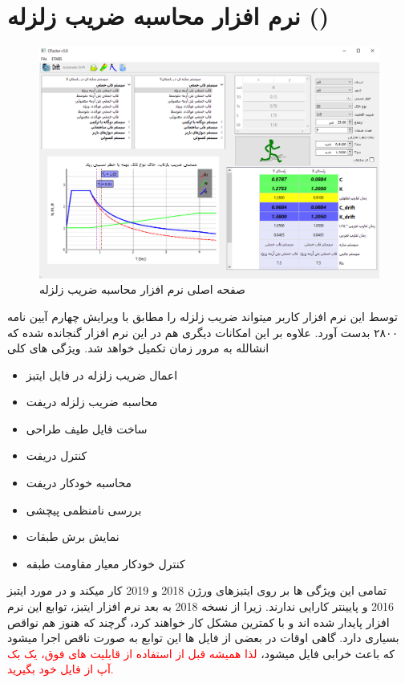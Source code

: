 \section{نرم افزار محاسبه ضریب زلزله ()}

\begin{figure}[H]
    \centering
    \includegraphics[scale=.6]{figures/cfactor}
    \caption{صفحه اصلی نرم افزار محاسبه ضریب زلزله}
\end{figure}
توسط این نرم افزار کاربر میتواند ضریب زلزله را مطابق با ویرایش چهارم آیین نامه ۲۸۰۰ بدست آورد. علاوه بر این امکانات دیگری هم در این نرم افزار گنجانده شده که انشالله به مرور زمان تکمیل خواهد شد. ویژگی های کلی

\begin{itemize}
    \item اعمال ضریب زلزله در فایل ایتبز
    \item محاسبه ضریب زلزله دریفت
    \item ساخت فایل طیف طراحی
    \item کنترل دریفت
    \item محاسبه خودکار دریفت
    \item بررسی نامنظمی پیچشی
    \item نمایش برش طبقات
    \item کنترل خودکار معیار مقاومت طبقه
\end{itemize}

تمامی این ویژگی ها بر روی ایتبزهای ورژن 2018 و 2019 کار میکند و در مورد ایتبز 2016 و پایینتر کارایی ندارند. زیرا از نسخه 2018 به بعد نرم افزار ایتبز، 
توابع 
این نرم افزار پایدار شده اند و با کمترین مشکل کار خواهند کرد، گرچند که هنوز هم نواقص بسیاری دارد.
گاهی اوقات در بعضی از فایل ها این توابع به صورت ناقص اجرا میشود که باعث خرابی فایل میشود، 
\textcolor{red}{لذا همیشه قبل از استفاده از قابلیت های فوق، یک بک آپ از فایل خود بگیرید.}
